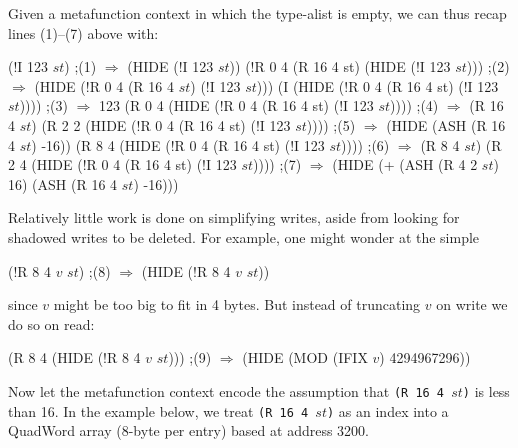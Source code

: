 \documentclass[submission,copyright,creativecommons]{eptcs}
\newcommand{\ptt}[1]{\tt{#1}}
\begin{document}
Given a metafunction context in which the type-alist is empty, we can
thus recap lines {\rm{(1)}}--{\rm{(7)}} above with:
\begin{acl2p}
(!I 123 $st$)                                                            ;{\rm{(1)}}
$\Longrightarrow$
(HIDE (!I 123 $st$))
\vspace*{0.0em}
(!R 0 4 (R 16 4 st) (HIDE (!I 123 $st$)))                                ;{\rm{(2)}}
$\Longrightarrow$
(HIDE (!R 0 4 (R 16 4 $st$) (!I 123 $st$)))
\vspace*{0.0em}
(I (HIDE (!R 0 4 (R 16 4 st)  (!I 123 $st$))))                           ;{\rm{(3)}}
$\Longrightarrow$
123
\vspace*{0.0em}
(R 0 4 (HIDE (!R 0 4 (R 16 4 st) (!I 123 $st$))))                        ;{\rm{(4)}}
$\Longrightarrow$
(R 16 4 $st$)
\vspace*{0.0em}
(R 2 2 (HIDE (!R 0 4 (R 16 4 st) (!I 123 $st$))))                        ;{\rm{(5)}}
$\Longrightarrow$
(HIDE (ASH (R 16 4 $st$) -16))
\vspace*{0.0em}
(R 8 4 (HIDE (!R 0 4 (R 16 4 st) (!I 123 $st$))))                        ;{\rm{(6)}}
$\Longrightarrow$
(R 8 4 $st$)
\vspace*{0.0em}
(R 2 4 (HIDE (!R 0 4 (R 16 4 st) (!I 123 $st$))))                        ;{\rm{(7)}}
$\Longrightarrow$
(HIDE (+ (ASH (R 4 2 $st$) 16)
         (ASH (R 16 4 $st$) -16)))
\end{acl2p}

Relatively little work is done on simplifying writes, aside from looking for
shadowed writes to be deleted.  For example, one might wonder at the simple
\begin{acl2p}
(!R 8 4 $v$ $st$)                                                          ;{\rm{(8)}}
$\Longrightarrow$
(HIDE (!R 8 4 $v$ $st$))
\end{acl2p}
{\noindent}since $v$ might be too big to fit in 4 bytes.  But instead of truncating $v$ on
write we do so on read:

\begin{acl2p}
(R 8 4 (HIDE (!R 8 4 $v$ $st$)))                                           ;{\rm{(9)}}
$\Longrightarrow$
(HIDE (MOD (IFIX $v$) 4294967296))
\end{acl2p}

Now let the metafunction context encode the assumption that {\ptt{(R 16 4
    $st$)}} is less than 16.  In the example below, we treat {\ptt{(R 16 4
    $st$)}} as an index into a QuadWord array (8-byte per entry) based at
address 3200.
\end{document}
